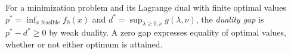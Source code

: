
For a minimization problem and its Lagrange dual with finite optimal values $p^*=\inf_{x\text{ feasible}}f_0(x)$ and $d^*=\sup_{\lambda\ge0,\nu}g(\lambda,\nu)$, the \emph{duality gap} is $p^*-d^*\ge0$ by weak duality. A zero gap expresses equality of optimal values, whether or not either optimum is attained.
